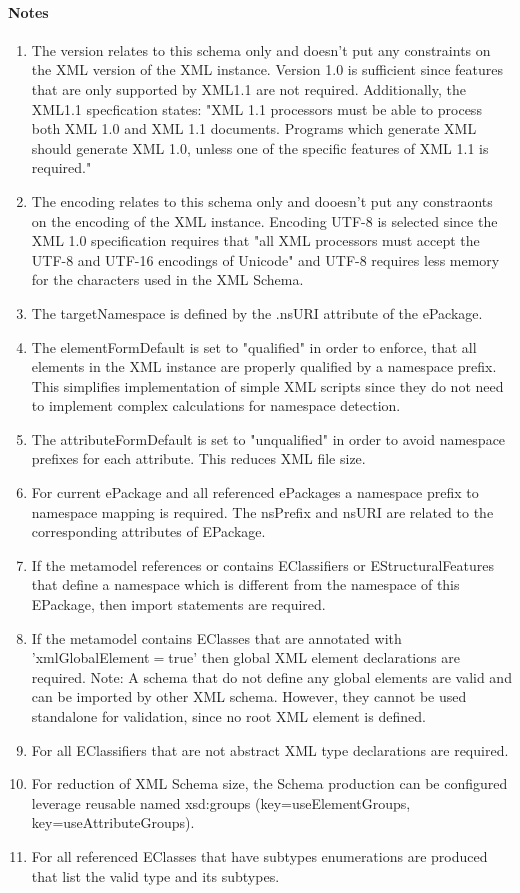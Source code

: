 \documentclass[11pt,a4paper]{article}
\begin{document}
\paragraph{Notes} 
\begin{enumerate}
\item The version relates to this schema only and doesn't put any constraints on the XML version of the XML instance. Version 1.0 is sufficient since features that are only supported by XML1.1 are not required. Additionally, the XML1.1 specfication states: "XML 1.1 processors must be able to process both XML 1.0 and XML 1.1 documents. Programs which generate XML should generate XML 1.0, unless one of the specific features of XML 1.1 is required."\cite{w3c:xml11}
\item The encoding relates to this schema only and dooesn't put any constraonts on the encoding of the XML instance. Encoding UTF-8 is selected since the XML 1.0 specification requires that  "all XML processors must accept the UTF-8 and UTF-16 encodings of Unicode"\cite{w3c:xml10} and UTF-8 requires less memory for the characters used in the XML Schema.
\item The targetNamespace is defined by the .nsURI attribute of the ePackage.
\item The elementFormDefault is set to "qualified" in order to enforce, that all elements in the XML instance are properly qualified by a namespace prefix. This simplifies implementation of simple XML scripts since they do not need to implement complex calculations for namespace detection.
\item The attributeFormDefault is set to "unqualified" in order to avoid namespace prefixes for each attribute. This reduces XML file size.
\item For current ePackage and all referenced ePackages a namespace prefix to namespace mapping is required. The nsPrefix and nsURI are related to the corresponding attributes of EPackage.
\item If the metamodel references or contains EClassifiers or EStructuralFeatures that define a namespace which is different from the namespace of this EPackage, then import statements are required.
\item If the metamodel contains EClasses that are annotated with 'xmlGlobalElement$=$true' then global XML element declarations are required. Note: A schema that do not define any global elements are valid and can be imported by other XML schema. However, they cannot be used standalone for validation, since no root XML element is defined.
\item For all EClassifiers that are not abstract XML type declarations are required.
\item For reduction of XML Schema size, the Schema production can be configured leverage reusable named xsd:groups (key=useElementGroups, key=useAttributeGroups). 
\item For all referenced EClasses that have subtypes enumerations are produced that list the valid type and its subtypes.  
\end{enumerate}
\end{document}
